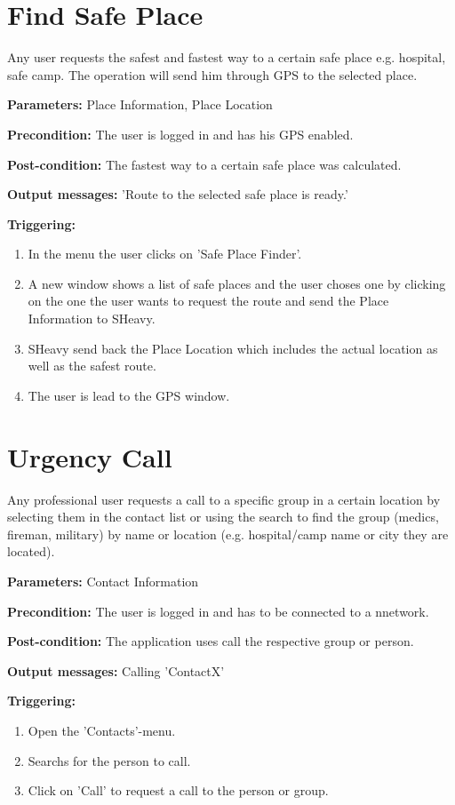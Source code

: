 \section{Find Safe Place}
\label{operation:FindSafePlace}
Any user requests the safest and fastest way to a certain safe place e.g. hospital,
safe camp. The operation will send him through GPS to the selected place.\\
\begin{description}
\item \textbf{Parameters:} Place Information, Place Location
\item \textbf{Precondition:} The user is logged in and has his GPS enabled.
\item \textbf{Post-condition:}  The fastest way to a certain safe place was
calculated.
\item \textbf{Output messages:} 'Route to the selected safe place is ready.'
\item \textbf{Triggering:}
\begin{enumerate}
\item In the menu the user clicks on 'Safe Place Finder'.
\item A new window shows a list of safe places and the user choses one by 
clicking on the one the user wants to request the route and send the Place Information to SHeavy.
\item SHeavy send back the Place Location which includes the actual location as well as the safest route.
\item The user is lead to the GPS window.
\end{enumerate}
\end{description}

\section{Urgency Call}
\label{operation:UrgencyCall}
Any professional user requests a call to a specific group in a certain location by selecting 
them in the contact list or using the search to find the group (medics, fireman, military) 
by name or location (e.g. hospital/camp name or city they are located).\\
\begin{description}
\item \textbf{Parameters:} Contact Information
\item \textbf{Precondition:} The user is logged in and has to be connected to a
nnetwork.
\item \textbf{Post-condition:} The application uses call the respective group or person.
\item \textbf{Output messages:} Calling 'ContactX'
\item \textbf{Triggering:}
\begin{enumerate}
\item Open the 'Contacts'-menu.
\item Searchs for the person to call.
\item Click on 'Call' to request a call to the person or group.
\end{enumerate}
\end{description} 


